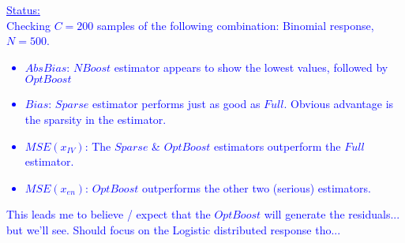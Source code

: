 \documentclass[12pt]{article}
\newcommand{\blue}[1]{\textcolor{blue}{#1}}
\begin{document}
 
\blue{\underline{Status:}\\
Checking $C=200$ samples of the following combination: Binomial response, $N = 500$.
\begin{itemize}
\item $AbsBias$: $NBoost$ estimator appears to show the lowest values, followed by $OptBoost$ 
\item $Bias$: $Sparse$ estimator performs just as good as $Full$. Obvious advantage is the sparsity in the estimator.
\item $MSE(x_{IV})$: The $Sparse$ \& $OptBoost$ estimators outperform the $Full$ estimator. 
\item $MSE(x_{en})$: $OptBoost$ outperforms the other two (serious) estimators.
\end{itemize}
This leads me to believe / expect that the $OptBoost$ will generate the \say{best} residuals... but we'll see.
Should focus on the Logistic distributed response tho... 
}


\pagebreak
\end{document}
